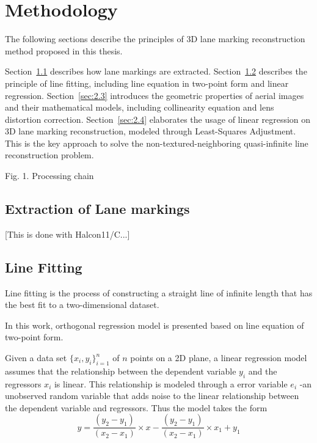 
\chapter{Methodology}
\label{chap:k2}

The following sections describe the principles of 3D lane marking reconstruction method proposed in this thesis. 

Section~\ref{sec:2.1} describes how lane markings are extracted.
Section~\ref{sec:2.2} describes the principle of line fitting, including line equation in two-point form and linear regression.
Section~\ref{sec:2.3} introduces the geometric properties of aerial images and their mathematical models, including collinearity equation and lens distortion correction. 
Section~\ref{sec:2.4} elaborates the usage of linear regression on 3D lane marking reconstruction, modeled through Least-Squares Adjustment. This is the key approach to solve the non-textured-neighboring quasi-infinite line reconstruction problem.




Fig. 1. Processing chain



\section{Extraction of Lane markings}
\label{sec:2.1}
[This is done with Halcon11/C...]



\section{Line Fitting}
\label{sec:2.2}

Line fitting is the process of constructing a straight line of infinite length that has the best fit to a two-dimensional dataset.

In this work, orthogonal regression model is presented based on line equation of two-point form.

Given a data set $\{x_i,y_i\}^n_{i=1}$ of $n$ points on a 2D plane, a linear regression model assumes that the relationship between the dependent variable $y_i$ and the regressors $x_i$ is linear. This relationship is modeled through a error variable $e_i$ -an unobserved random variable that adds noise to the linear relationship between the dependent variable and regressors.
Thus the model takes the form
\begin{equation} \label{eq:2.2}
y = \dfrac{(y_2-y_1)}{(x_2-x_1)}\times x-\dfrac{(y_2-y_1)}{(x_2-x_1)}\times x_1+y_1
\end{equation}

